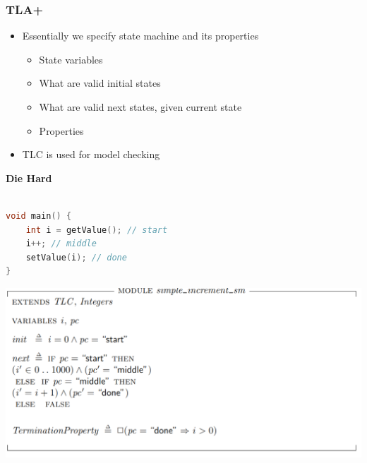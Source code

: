 \documentclass{beamer}
\begin{document}
\begin{frame}
    \frametitle{TLA+}
    \begin{itemize}
        \item Essentially we specify state machine and its properties 
        \begin{itemize}
            \item State variables
            \item What are valid initial states 
            \item What are valid next states, given current state 
            \item Properties
        \end{itemize}
        \item TLC is used for model checking 
    \end{itemize}
\end{frame}


\begin{frame}
    \begin{center}
        \LARGE{\textbf{Die Hard}}
    \end{center}
\end{frame}


\begin{frame}[fragile]
	\begin{lstlisting}[language=C++]

void main() {
    int i = getValue(); // start
    i++; // middle
    setValue(i); // done
}

	\end{lstlisting}
	
\end{frame}

\begin{frame}[fragile]
    \includegraphics[width=\textwidth]{./sm_increment.png}
\end{frame}
\end{document}
